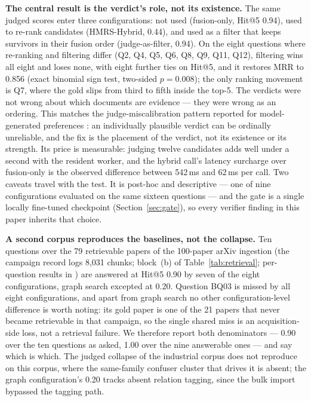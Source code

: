\textbf{The central result is the verdict's role, not its existence.} The same
judged scores enter three configurations: not used (fusion-only, Hit@5 0.94),
used to re-rank candidates (HMRS-Hybrid, 0.44), and used as a filter that
keeps survivors in their fusion order (judge-as-filter, 0.94). On the eight
questions where re-ranking and filtering differ (Q2, Q4, Q5, Q6, Q8, Q9, Q11,
Q12), filtering wins all eight and loses none, with eight further ties on
Hit@5, and it restores MRR to 0.856 (exact binomial sign test, two-sided
$p = 0.008$); the only ranking movement is Q7, where the gold slips from third
to fifth inside the top-5. The verdicts were not wrong about which documents
are evidence --- they were wrong as an ordering. This matches the
judge-miscalibration pattern reported for model-generated preferences
\cite{zheng-llmjudge,panickssery-selfpref}: an individually plausible verdict
can be ordinally unreliable, and the fix is the placement of the verdict, not
its existence or its strength. Its price is measurable: judging
twelve candidates adds well under a second with the resident worker, and the
hybrid call's latency surcharge over fusion-only is the observed difference
between 542\,ms and 62\,ms per call. Two caveats travel with the test. It is
post-hoc and descriptive --- one of nine configurations evaluated on the same
sixteen questions --- and the gate is a single locally fine-tuned checkpoint
(Section~\ref{sec:gate}), so every verifier finding in this paper inherits
that choice.

\textbf{A second corpus reproduces the baselines, not the collapse.} Ten
questions over the 79 retrievable papers of the 100-paper arXiv ingestion
(the campaign record logs 8{,}031 chunks; block~(b) of
Table~\ref{tab:retrieval}; per-question results in
) are answered
at Hit@5 0.90 by seven of the eight configurations, graph search excepted at
0.20. Question BQ03 is missed by all eight configurations, and apart from
graph search no other configuration-level difference is worth noting: its gold
paper is one of the 21 papers that never became
retrievable in that campaign, so the single shared miss is an acquisition-side
loss, not a retrieval failure. We therefore report both denominators --- 0.90 over
the ten questions as asked, 1.00 over the nine answerable ones --- and say
which is which. The judged collapse of the industrial corpus does not
reproduce on this corpus, where the same-family confuser cluster that drives
it is absent; the graph configuration's 0.20 tracks absent relation tagging,
since the bulk import bypassed the tagging path.

